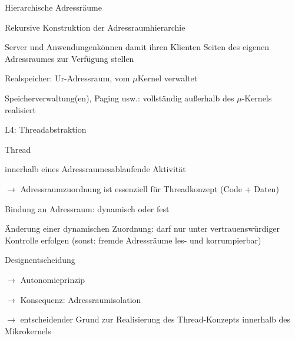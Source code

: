 \documentclass[a4paper]{article}
\begin{document}
\begin{multicols}{3}
    Hierarchische Adressräume

    \begin{itemize*}
        \item
        Rekursive Konstruktion der Adressraumhierarchie
        \begin{itemize*}
            \item Server und Anwendungenkönnen damit ihren Klienten Seiten des eigenen Adressraumes zur Verfügung stellen
            \item Realspeicher: Ur-Adressraum, vom $\mu$Kernel verwaltet
            \item Speicherverwaltung(en), Paging usw.: vollständig außerhalb des $\mu$-Kernels realisiert
        \end{itemize*}
    \end{itemize*}

    L4: Threadabstraktion

    \begin{itemize*}
        \item
        Thread
        \begin{itemize*}
            \item innerhalb eines Adressraumesablaufende Aktivität
            \item $\rightarrow$ Adressraumzuordnung ist essenziell für Threadkonzept (Code + Daten) \begin{itemize*} \item Bindung an Adressraum: dynamisch oder fest \item Änderung einer dynamischen Zuordnung: darf nur unter vertrauenswürdiger Kontrolle erfolgen (sonst: fremde Adressräume les- und korrumpierbar) \end{itemize*}
        \end{itemize*}
        \item
        Designentscheidung
        \begin{itemize*}
            \item $\rightarrow$ Autonomieprinzip
            \item $\rightarrow$ Konsequenz: Adressraumisolation
            \item $\rightarrow$ entscheidender Grund zur Realisierung des Thread-Konzepts innerhalb des Mikrokernels
        \end{itemize*}
    \end{itemize*}


\end{multicols}
\end{document}
